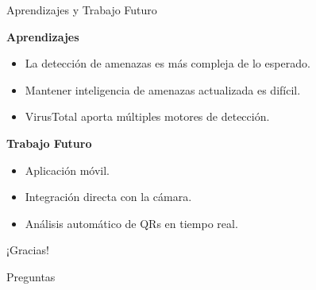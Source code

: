 \documentclass{beamer}
\begin{document}

\begin{frame}{Aprendizajes y Trabajo Futuro}

\textbf{Aprendizajes}

\begin{itemize}
    \item La detección de amenazas es más compleja de lo esperado.
    \item Mantener inteligencia de amenazas actualizada es difícil.
    \item VirusTotal aporta múltiples motores de detección.
\end{itemize}

\vspace{0.5cm}

\textbf{Trabajo Futuro}

\begin{itemize}
    \item Aplicación móvil.
    \item Integración directa con la cámara.
    \item Análisis automático de QRs en tiempo real.
\end{itemize}

\end{frame}


\begin{frame}
\centering

\Huge ¡Gracias!

\vspace{0.5cm}

\Large Preguntas

\end{frame}

\end{document}
